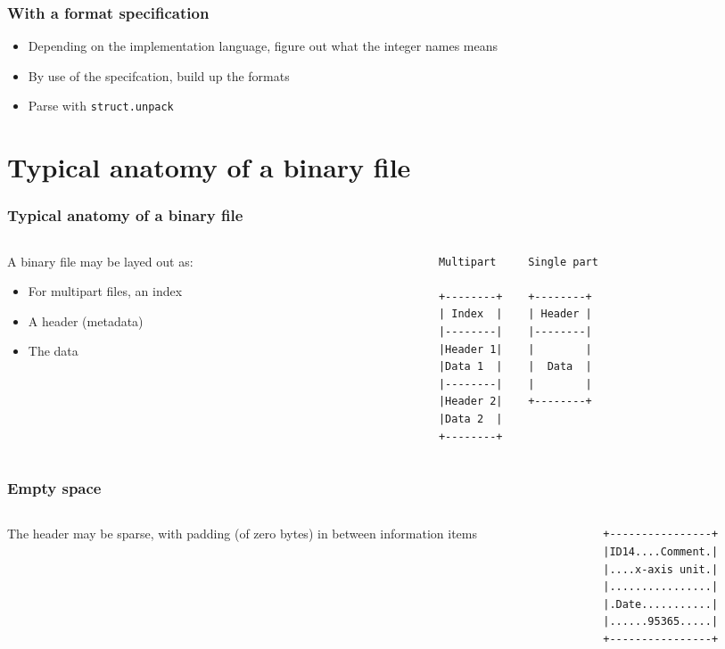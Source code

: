\documentclass{beamer}
\begin{document}
\begin{frame}[fragile]
  \frametitle{With a format specification}
  \begin{itemize}
  \item Depending on the implementation language, figure out what the integer names means
  \item By use of the specifcation, build up the formats
  \item Parse with \texttt{struct.unpack}
  \end{itemize}
\end{frame}

\section{Typical anatomy of a binary file}
\begin{frame}[fragile]
  \frametitle{Typical anatomy of a binary file}
  \begin{columns}[onlytextwidth]
    \begin{column}{0.4\textwidth}
      A binary file may be layed out as:
      \begin{itemize}
      \item For multipart files, an index
      \item A header (metadata)
      \item The data
      \end{itemize}
    \end{column}
    \begin{column}{0.6\textwidth}
      \begin{verbatim}
        Multipart     Single part

        +--------+    +--------+
        | Index  |    | Header |
        |--------|    |--------|
        |Header 1|    |        |
        |Data 1  |    |  Data  |
        |--------|    |        |
        |Header 2|    +--------+
        |Data 2  |
        +--------+
      \end{verbatim}
    \end{column}
  \end{columns}
\end{frame}

\begin{frame}[fragile]
  \frametitle{Empty space}
  \begin{columns}[onlytextwidth]
    \begin{column}{0.4\textwidth}
      The header may be sparse, with padding (of zero bytes) in between information items
    \end{column}
    \begin{column}{0.6\textwidth}
      \begin{verbatim}
        +----------------+
        |ID14....Comment.|
        |....x-axis unit.|
        |................|
        |.Date...........|
        |......95365.....|
        +----------------+
      \end{verbatim}
    \end{column}
  \end{columns}
\end{frame}
\end{document}
